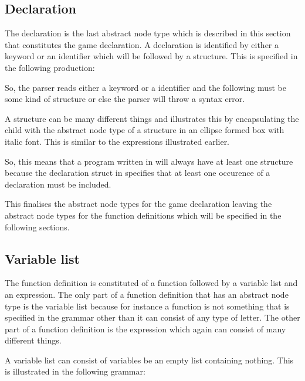 \subsection{Declaration}%
The declaration is the last abstract node type which is described in this section that constitutes the game declaration. A declaration is identified by either a keyword or an identifier which will be followed by a structure. This is specified in the following production:%

\begin{ebnf}%
%
\end{ebnf}%

So, the parser reads either a keyword or a identifier and the following must be some kind of structure or else the parser will throw a syntax error.%

A structure can be many different things and  illustrates this by encapsulating the child with the abstract node type of a structure in an ellipse formed box with italic font. This is similar to the expressions illustrated earlier.%

%

So, this means that a program written in \productname{} will always have at least one structure because the declaration struct in  specifies that at least one occurence of a declaration must be included.%

This finalises the abstract node types for the game declaration leaving the abstract node types for the function definitions which will be specified in the following sections.%

\subsection{Variable list}%

The function definition is constituted of a function followed by a variable list and an expression. The only part of a function definition that has an abstract node type is the variable list because for instance a function is not something that is specified in the grammar other than it can consist of any type of letter. The other part of a function definition is the expression which again can consist of many different things.%

A variable list can consist of variables be an empty list containing nothing. This is illustrated in the following grammar:%

